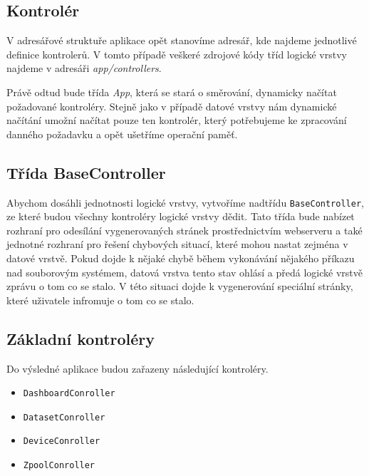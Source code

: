     \subsection{Kontrolér}
    V adresářové struktuře aplikace opět stanovíme adresář, kde najdeme jednotlivé definice kontrolerů. V tomto případě veškeré zdrojové kódy tříd logické vrstvy najdeme v adresáři \emph{app/controllers}.
    \begin{figure}
      \centering
    \end{figure}


    Právě odtud bude třída \emph{App}, která se stará o směrování, dynamicky načítat požadované kontroléry. Stejně jako v případě datové vrstvy nám dynamické načítání umožní načítat pouze ten kontrolér, který potřebujeme ke zpracování danného požadavku a opět ušetříme operační paměť.

    \subsection{Třída BaseController}
    Abychom dosáhli jednotnosti logické vrstvy, vytvoříme nadtřídu \verb|BaseController|, ze které budou všechny kontroléry logické vrstvy dědit. Tato třída bude nabízet rozhraní pro odesílání vygenerovaných stránek prostřednictvím webserveru a také jednotné rozhraní pro řešení chybových situací, které mohou nastat zejména v datové vrstvě. Pokud dojde k nějaké chybě během vykonávání nějakého příkazu nad souborovým systémem, datová vrstva tento stav ohlásí a předá logické vrstvě zprávu o tom co se stalo. V této situaci dojde k vygenerování speciální stránky, které uživatele infromuje o tom co se stalo.
    \subsection{Základní kontroléry}
    Do výsledné aplikace budou zařazeny následující kontroléry.
    \begin{itemize}
      \item \verb|DashboardConroller|
      \item \verb|DatasetConroller|
      \item \verb|DeviceConroller|
      \item \verb|ZpoolConroller|
    \end{itemize}


